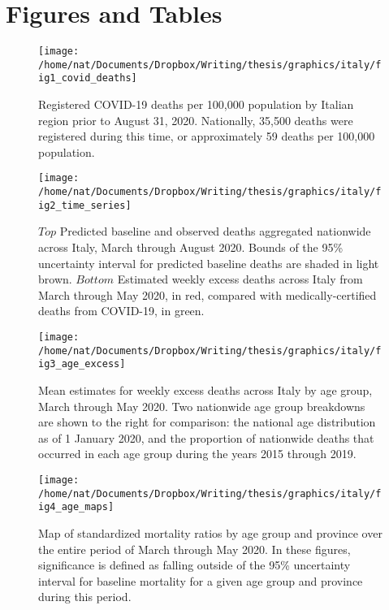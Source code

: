 \documentclass[
]{article}
\begin{document}
\newpage

\hypertarget{figures-and-tables}{%
\section{Figures and Tables}\label{figures-and-tables}}

\begin{figure}[!ht]

{\centering \texttt{[image: /home/nat/Documents/Dropbox/Writing/thesis/graphics/italy/fig1\_covid\_deaths]} 

}

\caption{Registered COVID-19 deaths per 100,000 population by Italian region prior to August 31, 2020. Nationally, 35,500 deaths were registered during this time, or approximately 59 deaths per 100,000 population.}\label{fig:covid-deaths}
\end{figure}
\newpage

\begin{figure}[!ht]

{\centering \texttt{[image: /home/nat/Documents/Dropbox/Writing/thesis/graphics/italy/fig2\_time\_series]} 

}

\caption{\(Top\) Predicted baseline and observed deaths aggregated nationwide across Italy, March through August 2020. Bounds of the 95\% uncertainty interval for predicted baseline deaths are shaded in light brown. \(Bottom\) Estimated weekly excess deaths across Italy from March through May 2020, in red, compared with medically-certified deaths from COVID-19, in green.}\label{fig:time-series}
\end{figure}
\newpage

\begin{figure}[!ht]

{\centering \texttt{[image: /home/nat/Documents/Dropbox/Writing/thesis/graphics/italy/fig3\_age\_excess]} 

}

\caption{Mean estimates for weekly excess deaths across Italy by age group, March through May 2020. Two nationwide age group breakdowns are shown to the right for comparison: the national age distribution as of 1 January 2020, and the proportion of nationwide deaths that occurred in each age group during the years 2015 through 2019.}\label{fig:age-excess}
\end{figure}
\newpage

\begin{figure}[!ht]

{\centering \texttt{[image: /home/nat/Documents/Dropbox/Writing/thesis/graphics/italy/fig4\_age\_maps]} 

}

\caption{Map of standardized mortality ratios by age group and province over the entire period of March through May 2020. In these figures, significance is defined as falling outside of the 95\% uncertainty interval for baseline mortality for a given age group and province during this period.}\label{fig:age-maps}
\end{figure}
\newpage
\end{document}
